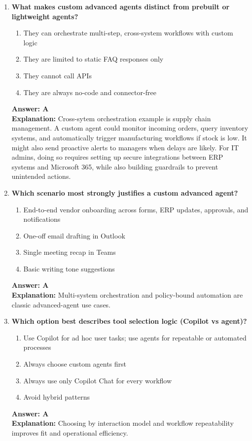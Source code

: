 \documentclass[10pt]{article}
\begin{document}
\begin{enumerate}[leftmargin=*]
\item \textbf{What makes custom advanced agents distinct from prebuilt or lightweight agents?}
\begin{enumerate}[label=\Alph*.]
  \item They can orchestrate multi-step, cross-system workflows with custom logic
  \item They are limited to static FAQ responses only
  \item They cannot call APIs
  \item They are always no-code and connector-free
\end{enumerate}
\textbf{Answer: A}\\
\textbf{Explanation:} Cross-sytem orchestration example is supply chain management. A custom agent could monitor incoming orders, query inventory systems, and automatically trigger manufacturing workflows if stock is low. It might also send proactive alerts to managers when delays are likely. For IT admins, doing so requires setting up secure integrations between ERP systems and Microsoft 365, while also building guardrails to prevent unintended actions.

\item \textbf{Which scenario most strongly justifies a custom advanced agent?}
\begin{enumerate}[label=\Alph*.]
  \item End-to-end vendor onboarding across forms, ERP updates, approvals, and notifications
  \item One-off email drafting in Outlook
  \item Single meeting recap in Teams
  \item Basic writing tone suggestions
\end{enumerate}
\textbf{Answer: A}\\
\textbf{Explanation:} Multi-system orchestration and policy-bound automation are classic advanced-agent use cases.

\item \textbf{Which option best describes tool selection logic (Copilot vs agent)?}
\begin{enumerate}[label=\Alph*.]
  \item Use Copilot for ad hoc user tasks; use agents for repeatable or automated processes
  \item Always choose custom agents first
  \item Always use only Copilot Chat for every workflow
  \item Avoid hybrid patterns
\end{enumerate}
\textbf{Answer: A}\\
\textbf{Explanation:} Choosing by interaction model and workflow repeatability improves fit and operational efficiency.


\end{enumerate}
\end{document}
